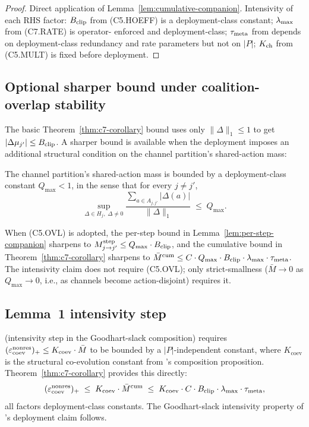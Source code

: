 \begin{proof}
Direct application of Lemma~\ref{lem:cumulative-companion}.
Intensivity of each RHS factor: $B_{\mathrm{clip}}$ from (C5.HOEFF) is a
deployment-class constant; $\lambda_{\max}$ from (C7.RATE) is operator-
enforced and deployment-class; $\tau_{\mathrm{meta}}$ from
\citep{lasser2026phase} depends on deployment-class redundancy
and rate parameters but not on $|P|$; $K_{\mathrm{ch}}$ from (C5.MULT) is
fixed before deployment.
\end{proof}

\subsection{Optional sharper bound under coalition-overlap stability}

The basic Theorem~\ref{thm:c7-corollary} bound uses only
$\|\Delta\|_1 \leq 1$ to get $|\Delta\mu_{j'}| \leq B_{\mathrm{clip}}$. A
sharper bound is available when the deployment imposes an
additional structural condition on the channel partition's
shared-action mass:

\begin{definition}
\label{def:c5-ovl}
The channel partition's shared-action mass is bounded by a
deployment-class constant $Q_{\max} < 1$, in the sense that for
every $j \neq j'$,
\[
  \sup_{\Delta \in H_j,\; \Delta \neq 0}
  \frac{\sum_{a \in A_{j, j'}} |\Delta(a)|}{\|\Delta\|_1}
  \;\leq\; Q_{\max}.
\]
\end{definition}

When (C5.OVL) is adopted, the per-step bound in
Lemma~\ref{lem:per-step-companion} sharpens to
$M_{j \to j'}^{\mathrm{step}} \leq Q_{\max} \cdot B_{\mathrm{clip}}$, and the
cumulative bound in Theorem~\ref{thm:c7-corollary} sharpens to
$\bar{M}^{\mathrm{cum}} \leq C \cdot Q_{\max} \cdot B_{\mathrm{clip}} \cdot
\lambda_{\max} \cdot \tau_{\mathrm{meta}}$. The intensivity claim does not require
(C5.OVL); only strict-smallness ($\bar{M} \to 0$ as $Q_{\max} \to
0$, i.e., as channels become action-disjoint) requires it.

\subsection{Lemma~1 intensivity step}

\citep[Lemma~1, Step~6]{lasser2026paper10} (intensivity step in
the Goodhart-slack composition) requires
$(\varepsilon_{\mathrm{coev}}^{\mathrm{nonres}})_+ \leq K_{\mathrm{coev}} \cdot \bar{M}$ to be
bounded by a $|P|$-independent constant, where $K_{\mathrm{coev}}$
is the structural co-evolution constant from
\citep{lasser2026micro}'s composition proposition.
Theorem~\ref{thm:c7-corollary} provides this directly:
\begin{equation}
  (\varepsilon_{\mathrm{coev}}^{\mathrm{nonres}})_+ \;\leq\; K_{\mathrm{coev}} \cdot
  \bar{M}^{\mathrm{cum}} \;\leq\; K_{\mathrm{coev}} \cdot C \cdot
  B_{\mathrm{clip}} \cdot \lambda_{\max} \cdot \tau_{\mathrm{meta}},
\end{equation}
all factors deployment-class constants. The Goodhart-slack
intensivity property of \citep[Deployment Safety]{lasser2026paper10}'s deployment
claim follows.

